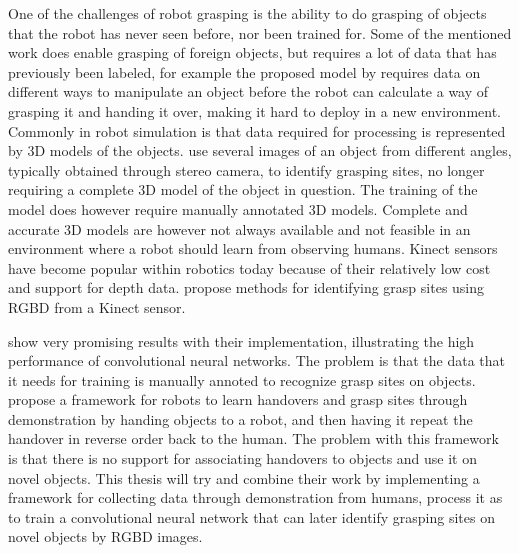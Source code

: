 One of the challenges of robot grasping is the ability to do grasping of objects that the robot has never seen before, nor been trained for. Some of the mentioned work does enable grasping of foreign objects, but requires a lot of data that has previously been labeled, for example the proposed model by \textcite{Chan2014} requires data on different ways to manipulate an object before the robot can calculate a way of grasping it and handing it over, making it hard to deploy in a new environment. Commonly in robot simulation is that data required for processing is represented by 3D models of the objects. \textcite{Saxena2008} use several images of an object from different angles, typically obtained through stereo camera, to identify grasping sites, no longer requiring a complete 3D model of the object in question. The training of the model does however require manually annotated 3D models. Complete and accurate 3D models are however not always available and not feasible in an environment where a robot should learn from observing humans. Kinect sensors have become popular within robotics today because of their relatively low cost and support for depth data. \parencite{Lenz2015} \parencite{Redmon2014} \parencite{Jiang2011} propose methods for identifying grasp sites using RGBD from a Kinect sensor.

\textcite{Redmon2014} show very promising results with their implementation, illustrating the high performance of convolutional neural networks. The problem is that the data that it needs for training is manually annoted to recognize grasp sites on objects. \parencite{Chan2015a} propose a framework for robots to learn handovers and grasp sites through demonstration by handing objects to a robot, and then having it repeat the handover in reverse order back to the human. The problem with this framework is that there is no support for associating handovers to objects and use it on novel objects. This thesis will try and combine their work by implementing a framework for collecting data through demonstration from humans, process it as to train a convolutional neural network that can later identify grasping sites on novel objects by RGBD images.
